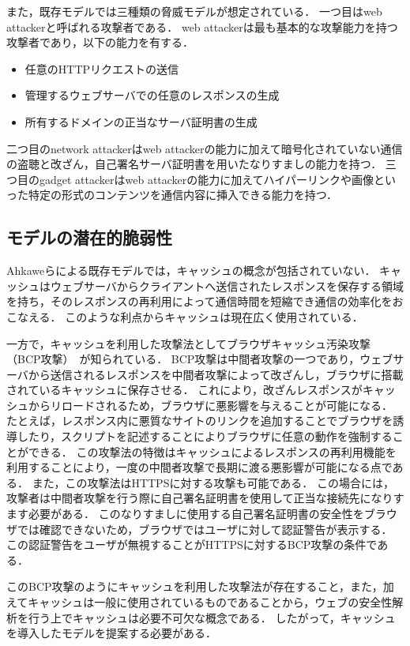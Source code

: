 \documentclass{css}
\begin{document}
また，既存モデルでは三種類の脅威モデルが想定されている．
一つ目はweb attackerと呼ばれる攻撃者である．
web attackerは最も基本的な攻撃能力を持つ攻撃者であり，以下の能力を有する．
\begin{itemize}
\item 任意のHTTPリクエストの送信
\item 管理するウェブサーバでの任意のレスポンスの生成
\item 所有するドメインの正当なサーバ証明書の生成
\end{itemize}
二つ目のnetwork attackerはweb attackerの能力に加えて暗号化されていない通信の盗聴と改ざん，自己署名サーバ証明書を用いたなりすましの能力を持つ．
三つ目のgadget attackerはweb attackerの能力に加えてハイパーリンクや画像といった特定の形式のコンテンツを通信内容に挿入できる能力を持つ．

\subsection{モデルの潜在的脆弱性}
\label{sec:problem}
Ahkaweらによる既存モデル\cite{webmodel}では，キャッシュの概念が包括されていない．
キャッシュはウェブサーバからクライアントへ送信されたレスポンスを保存する領域を持ち，そのレスポンスの再利用によって通信時間を短縮でき通信の効率化をおこなえる．
このような利点からキャッシュは現在広く使用されている．

一方で，キャッシュを利用した攻撃法としてブラウザキャッシュ汚染攻撃（BCP攻撃）~\cite{bcpattack}が知られている．
BCP攻撃は中間者攻撃の一つであり，ウェブサーバから送信されるレスポンスを中間者攻撃によって改ざんし，ブラウザに搭載されているキャッシュに保存させる．
これにより，改ざんレスポンスがキャッシュからリロードされるため，ブラウザに悪影響を与えることが可能になる．
たとえば，レスポンス内に悪質なサイトのリンクを追加することでブラウザを誘導したり，スクリプトを記述することによりブラウザに任意の動作を強制することができる．
この攻撃法の特徴はキャッシュによるレスポンスの再利用機能を利用することにより，一度の中間者攻撃で長期に渡る悪影響が可能になる点である．
また，この攻撃法はHTTPSに対する攻撃も可能である．
この場合には，攻撃者は中間者攻撃を行う際に自己署名証明書を使用して正当な接続先になりすます必要がある．
このなりすましに使用する自己署名証明書の安全性をブラウザでは確認できないため，ブラウザではユーザに対して認証警告が表示する．
この認証警告をユーザが無視することがHTTPSに対するBCP攻撃の条件である．

このBCP攻撃のようにキャッシュを利用した攻撃法が存在すること，また，加えてキャッシュは一般に使用されているものであることから，ウェブの安全性解析を行う上でキャッシュは必要不可欠な概念である．
したがって，キャッシュを導入したモデルを提案する必要がある．
\end{document}
